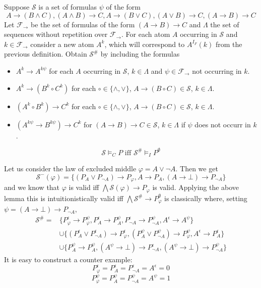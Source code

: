 \documentclass[a4paper,UKenglish,cleveref, autoref, thm-restate]{lipics-v2021}
\begin{document}
\begin{definition}
	Suppose $\mathcal S$ is a set of formulas $\psi$ of the form
	$$A\to (B\wedge C), (A\wedge B)\to C, A\to (B\vee C),(A\vee B)\to C, (A\to B)\to C$$
	Let $\mathcal F_\to$ be the set of formulas of the form $(A\to B)\to C$ and $\Lambda$ the set of sequences without repetition over $\mathcal F_\to$. For each atom $A$ occurring in $\mathcal S$ and $k\in \mathcal F_\to$ consider a new atom $A^{k}$, which will correspond to $A^{I_F}(k)$ from the previous definition. Obtain $\mathcal S^\#$ by including the formulas
	\begin{itemize}
		\item $A^k\to A^{k\psi}$ for each $A$ occurring in $\mathcal S$, $k\in\Lambda$ and $\psi\in\mathcal F_\to$ not occurring in $k$.
		\item $A^k\to (B^k\circ C^k)$ for each $\circ\in\{\wedge,\vee\}$, $A\to (B\circ C)\in\mathcal S$, $k\in\Lambda$.
		\item $(A^k\circ B^k)\to C^k$ for each $\circ\in\{\wedge,\vee\}$, $A\to (B\circ C)\in\mathcal S$, $k\in\Lambda$.
		\item $(A^{k\psi}\to B^{k\psi})\to C^k$ for $(A\to B)\to C\in\mathcal S$, $k\in\Lambda$ if $\psi$ does not occurr in $k$.
	\end{itemize}
\end{definition}

\begin{theorem}
	$$\mathcal S\models_C P\text{ iff }\mathcal S^\#\models_I P^\emptyset$$
\end{theorem}

\begin{example}
	Let us consider the law of excluded middle $\varphi = A\vee\neg A$. Then we get
	$$\mathcal S^-(\varphi) = \{(P_A\vee P_{\neg A})\to P_\varphi, A\to P_A, (A\to \bot)\to P_{\neg A}\}$$
	and we know that $\varphi$ is valid iff $\bigwedge \mathcal S(\varphi)\to P_\varphi$ is valid. Applying the above lemma this is intuitionistically valid iff $\bigwedge\mathcal S^\#\to P^\emptyset_\varphi$ is classically where, setting $\psi = (A\to \bot)\to P_{\neg A}$,
	\begin{align*}
		\mathcal S^\# =&\{P_\varphi^\epsilon\to P_\varphi^{\psi}, P_A^\epsilon\to P_A^{\psi},P_{\neg A}^\epsilon\to P_{\neg A}^{\psi},A^\epsilon\to A^{\psi}\}\\ &\cup\{(P_A^\epsilon\vee P_{\neg A}^\epsilon)\to P_\varphi^\epsilon, (P_A^{\psi}\vee P_{\neg A}^{\psi})\to P_\varphi^{\psi},  A^\epsilon\to P_A^\epsilon\}\\ &\cup \{P_A^{\psi}\to P_A^{\psi}, (A^{\psi}\to \bot)\to P_{\neg A}^\epsilon, (A^{\psi}\to \bot)\to P_{\neg A}^{\psi}\}
	\end{align*}
	It is easy to construct a counter example:
	$$P_\varphi^\epsilon  = P_A^\epsilon = P_{\neg A}^\epsilon = A^\epsilon = 0$$
	$$P_{\varphi}^{\psi} = P_A^{\psi} =  P_{\neg A}^{\psi} = A^{\psi} = 1$$
\end{example}	
\end{document}
